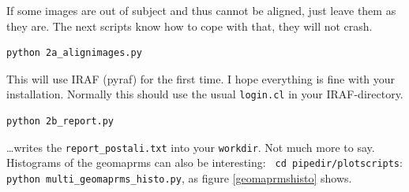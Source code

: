 If some images are out of subject and thus cannot be aligned, just leave them as they are. The next scripts know how to cope with that, they will not crash.

\begin{Verbatim}
python 2a_alignimages.py
\end{Verbatim}

This will use IRAF (pyraf) for the first time. I hope everything is fine with your installation. Normally this should use the usual \verb+login.cl+ in your IRAF-directory.


\begin{Verbatim}
python 2b_report.py
\end{Verbatim}

\ldots writes the \verb+report_postali.txt+ into your \verb+workdir+. Not much more to say. Histograms of the geomaprms can also be interesting: \verb+ cd pipedir/plotscripts+:\\ \verb+python multi_geomaprms_histo.py+, as figure \ref{geomaprmshisto} shows. 

